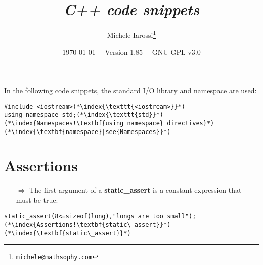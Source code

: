\documentclass[10pt]{article}
\begin{document}
\title{\emph{C++ code snippets}}
\author{Michele Iarossi\thanks{\texttt{michele@mathsophy.com}}}
\date{\small \today~-~Version 1.85~-~GNU GPL v3.0}


\maketitle

\small

\begin{frame}{}
\setlength\columnsep{1cm}
\begin{multicols}{2}
\tableofcontents
\end{multicols}
\end{frame}
\newpage
\noindent
In the following code snippets, the standard I/O library and namespace are used:
\begin{lstlisting}
#include <iostream>(*\index{\texttt{<iostream>}}*)
using namespace std;(*\index{\texttt{std}}*)(*\index{Namespaces!\textbf{using namespace} directives}*)(*\index{\textbf{namespace}|see{Namespaces}}*)
\end{lstlisting}
%
%
\section{Assertions}
\small
\begin{enumerate}
\item[$\Rightarrow$] The first argument of a \textbf{static\_assert} is a constant expression that must be true:
\end{enumerate}
\begin{lstlisting}
static_assert(8<=sizeof(long),"longs are too small");(*\index{Assertions!\textbf{static\_assert}}*)(*\index{\textbf{static\_assert}}*)
\end{lstlisting}
%
%
\end{document}
